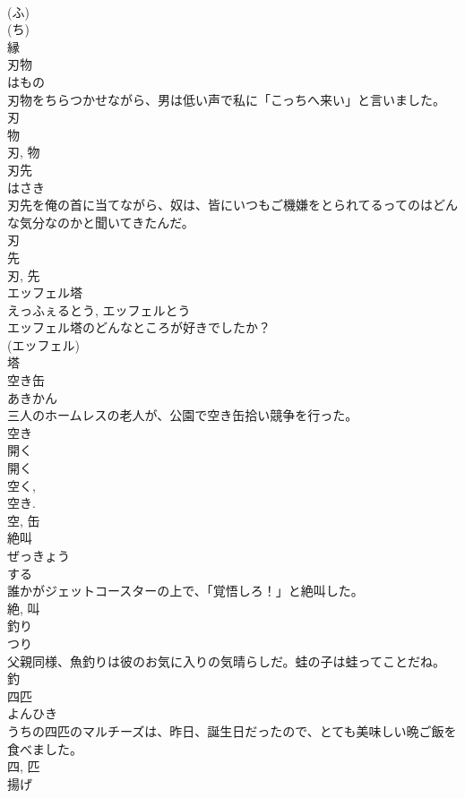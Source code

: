 \documentclass[8pt]{extreport}
\begin{document}
\begin{CJK}{UTF8}{min}
\\	(ふ) 
\\	(ち) 
\\	縁	
\\	刃物	
\\	はもの	
\\	刃物をちらつかせながら、男は低い声で私に「こっちへ来い」と言いました。	
\\	刃
\\	物 
\\	刃, 物	
\\	刃先	
\\	はさき	
\\	刃先を俺の首に当てながら、奴は、皆にいつもご機嫌をとられてるってのはどんな気分なのかと聞いてきたんだ。	
\\	刃 
\\	先 
\\	刃, 先	
\\	エッフェル塔	
\\	えっふぇるとう, エッフェルとう	
\\	エッフェル塔のどんなところが好きでしたか？	
\\	(エッフェル) 
\\	塔	
\\	空き缶	
\\	あきかん	
\\	三人のホームレスの老人が、公園で空き缶拾い競争を行った。	
\\	空き 
\\	開く 
\\	開く 
\\	空く, 
\\	空き.
\\	空, 缶	
\\	絶叫	
\\	ぜっきょう	
\\	する 
\\	誰かがジェットコースターの上で、「覚悟しろ！」と絶叫した。	
\\	絶, 叫	
\\	釣り	
\\	つり	
\\	父親同様、魚釣りは彼のお気に入りの気晴らしだ。蛙の子は蛙ってことだね。	
\\	釣	
\\	四匹	
\\	よんひき	
\\	うちの四匹のマルチーズは、昨日、誕生日だったので、とても美味しい晩ご飯を食べました。	
\\	四, 匹	
\\	揚げ	

\end{CJK}
\end{document}
